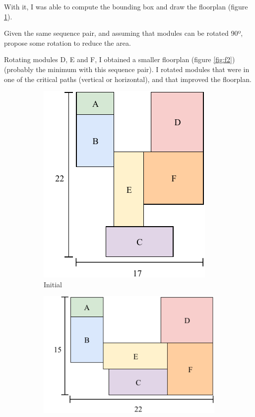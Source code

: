 \documentclass[a4paper, 10pt]{article}
\begin{document}
With it, I was able to compute the bounding box and draw the floorplan (figure \ref{fig:f1}).

{\color{statement} Given the same sequence pair, and assuming that modules can be rotated 90º, propose some rotation to reduce the area.}

Rotating modules D, E and F, I obtained a smaller floorplan (figure \ref{fig:f2}) (probably the minimum with this sequence pair). I rotated modules that were in one of the critical paths (vertical or horizontal), and that improved the floorplan.

\begin{figure}[H]
    \centering
    \begin{subfigure}{0.3\textwidth}
        \centering
        \includegraphics[width=1\linewidth]{4_1.pdf}
        \caption{Initial}
        \label{fig:f1}
    \end{subfigure}
    \hfill
    \begin{subfigure}{0.45\textwidth}
        \centering
        \includegraphics[width=1\linewidth]{4_2.pdf}

\end{subfigure}
\end{figure}
\end{document}
